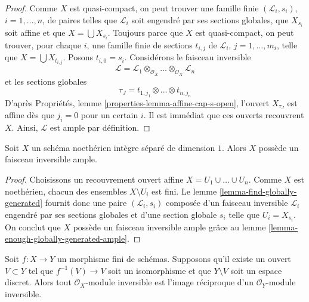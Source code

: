 \begin{proof}
Comme $X$ est quasi-compact, on peut trouver une famille finie
$(\mathcal{L}_i, s_i)$, $i = 1, \ldots, n$,
de paires telles que $\mathcal{L}_i$ soit engendré par ses sections globales, que $X_{s_i}$
soit affine et que $X = \bigcup X_{s_i}$.
Toujours parce que $X$ est quasi-compact, on peut trouver, pour chaque $i$, une famille
finie de sections $t_{i, j}$ de $\mathcal{L}_i$, $j = 1, \ldots, m_i$,
telle que $X = \bigcup X_{t_{i, j}}$. Posons $t_{i, 0} = s_i$.
Considérons le faisceau inversible
$$
\mathcal{L} = \mathcal{L}_1 
\otimes_{\mathcal{O}_X} \ldots
\otimes_{\mathcal{O}_X} \mathcal{L}_n
$$
et les sections globales
$$
\tau_J = t_{1, j_1} \otimes \ldots \otimes t_{n, j_n}
$$
D'après Propriétés, lemme \ref{properties-lemma-affine-cap-s-open},
l'ouvert $X_{\tau_J}$ est affine dès que $j_i = 0$ pour un certain $i$.
Il est immédiat que ces ouverts recouvrent $X$.
Ainsi, $\mathcal{L}$ est ample par définition.
\end{proof}

\begin{lemma}
\label{lemma-dim-1-noetherian-integral-separated-has-ample}
Soit $X$ un schéma noethérien intègre séparé de dimension $1$.
Alors $X$ possède un faisceau inversible ample.
\end{lemma}

\begin{proof}
Choisissons un recouvrement ouvert affine $X = U_1 \cup \ldots \cup U_n$.
Comme $X$ est noethérien, chacun des ensembles $X \setminus U_i$ est fini.
Le lemme \ref{lemma-find-globally-generated}
fournit donc une paire $(\mathcal{L}_i, s_i)$
composée d'un faisceau inversible $\mathcal{L}_i$ engendré par ses sections globales
et d'une section globale $s_i$ telle que $U_i = X_{s_i}$.
On conclut que $X$ possède un faisceau inversible ample grâce au
lemme \ref{lemma-enough-globally-generated-ample}.
\end{proof}

\begin{lemma}
\label{lemma-surjective-pic-birational-finite}
Soit $f : X \to Y$ un morphisme fini de schémas. Supposons qu'il
existe un ouvert $V \subset Y$ tel que $f^{-1}(V) \to V$ soit un
isomorphisme et que $Y \setminus V$ soit un espace discret. Alors tout
$\mathcal{O}_X$-module inversible est l'image réciproque d'un
$\mathcal{O}_Y$-module inversible.
\end{lemma}

